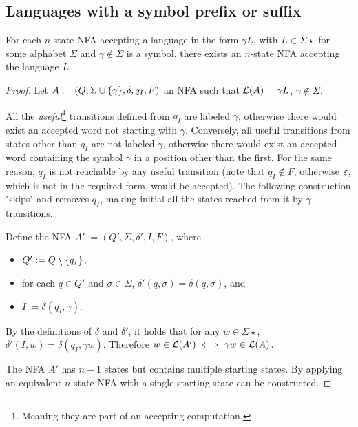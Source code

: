 \subsection{Languages with a symbol prefix or suffix}
\begin{thrm}
	For each $n$-state NFA accepting a language in the form $\gamma L$, with $L\in\Sigma\star$ for some alphabet $\Sigma$ and $\gamma\notin\Sigma$ is a symbol, there exists an $n$-state NFA accepting the language $L$.
\end{thrm}
\begin{proof}
	Let $A:=(Q,\Sigma\cup\{\gamma\},\delta,q_I,F)$ an NFA such that $\mathcal L(A)=\gamma L$, $\gamma\notin\Sigma$.

	All the \emph{useful}\footnote{Meaning they are part of an accepting computation.} transitions defined from $q_I$ are labeled $\gamma$, otherwise there would exist an accepted word not starting with $\gamma$.
	Conversely, all useful transitions from states other than $q_I$ are not labeled $\gamma$, otherwise there would exist an accepted word containing the symbol $\gamma$ in a position other than the first.
	For the same reason, $q_I$ is not reachable by any useful transition (note that $q_I\notin F$, otherwise $\varepsilon$, which is not in the required form, would be accepted).
	The following construction "skips" and removes $q_I$, making initial all the states reached from it by $\gamma$-transitions.

	Define the NFA $A':=(Q',\Sigma,\delta',I,F)$, where
	\begin{itemize}
		\item $Q':=Q\setminus\{q_I\}$,
		\item for each $q\in Q'$ and $\sigma\in\Sigma$, $\delta'(q,\sigma)=\delta(q,\sigma)$, and
		\item $I:=\delta(q_I,\gamma)$.
	\end{itemize}

	By the definitions of $\delta$ and $\delta'$, it holds that for any $w\in\Sigma\star$, $\delta'(I,w)=\delta(q_I,\gamma w)$.
	Therefore $w\in\mathcal L(A')\iff \gamma w\in\mathcal L(A)$.

	The NFA $A'$ has $n-1$ states but contains multiple starting states. By applying  an equivalent $n$-state NFA with a single starting state can be constructed.
\end{proof}


